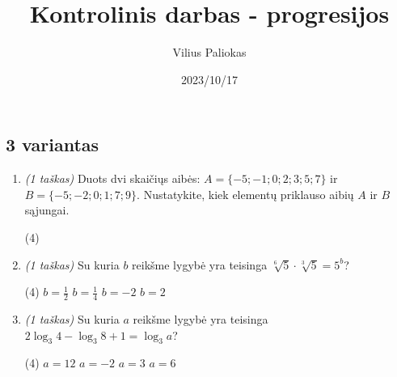 \documentclass[a4paper]{article}
\title{Kontrolinis darbas - progresijos}
\author{Vilius Paliokas}
\date{2023/10/17}
\begin{document}
\thispagestyle{fancy}

\titlespacing*{\subsection}{0pt}{.75ex}{0.75ex}

\subsection*{3 variantas}

\begin{enumerate}
      \item \textit{(1 taškas)} Duots dvi skaičiųs aibės: $A=\{-5; -1; 0; 2; 3;
                  5; 7\}$ ir $B=\{-5; -2; 0; 1; 7; 9\}$. Nustatykite, kiek
            elementų priklauso aibių
            $A$ ir $B$ sąjungai.
            \begin{tasks}[item-format={\normalfont}, after-item-skip=2mm,
                        label=\Alph*, label-format={\bfseries}](4)
            \end{tasks}

      \item \textit{(1 taškas)} Su kuria $b$ reikšme lygybė yra teisinga
            $\sqrt[6]{5}\cdot\sqrt[3]{5}=5^b$?
            \begin{tasks}[item-format={\normalfont}, after-item-skip=2mm,
                        label=\Alph*, label-format={\bfseries}](4)
                  \task $b=\frac{1}{2}$
                  \task $b=\frac{1}{4}$
                  \task $b=-2$
                  \task $b=2$
            \end{tasks}

      \item \textit{(1 taškas)} Su kuria $a$ reikšme lygybė yra teisinga
            $2\log_{3} 4-\log_{3} 8 + 1 = \log_{3} a$?
            \begin{tasks}[item-format={\normalfont}, after-item-skip=2mm,
                        label=\Alph*, label-format={\bfseries}](4)
                  \task $a=12$
                  \task $a=-2$
                  \task $a=3$
                  \task $a=6$
            \end{tasks}


\end{enumerate}
\end{document}

